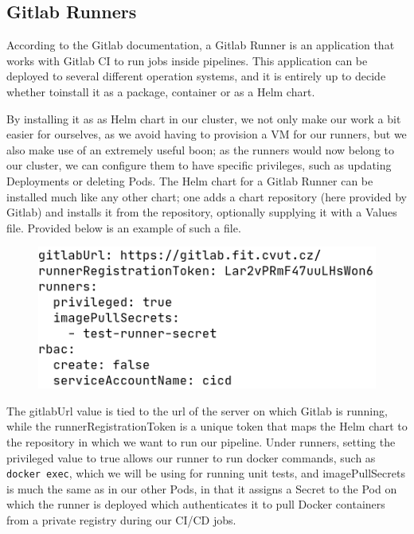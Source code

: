 \documentclass[thesis=B,english]{FITthesis}[2019/12/23]
\begin{document}
\subsection{Gitlab Runners}

According to the Gitlab documentation, a Gitlab Runner is an application that works with Gitlab CI to run jobs inside pipelines. This application can be deployed to several different operation systems, and it is entirely up to decide whether toinstall it as a package, container or as a Helm chart.

By installing it as as Helm chart in our cluster, we not only make our work a bit easier for ourselves, as we avoid having to provision a VM for our runners, but we also make use of an extremely useful boon; as the runners would now belong to our cluster, we can configure them to have specific privileges, such as updating Deployments or deleting Pods. The Helm chart for a Gitlab Runner can be installed much like any other chart; one adds a chart repository (here provided by Gitlab) and installs it from the repository, optionally supplying it with a Values file. Provided below is an example of such a file.

\begin{figure}[H]
\centering
\hspace*{-0.6cm}
\includegraphics[scale=0.5]{runner-values}
\end{figure}

The gitlabUrl value is tied to the url of the server on which Gitlab is running, while the runnerRegistrationToken is a unique token that maps the Helm chart to the repository in which we want to run our pipeline. Under runners, setting the privileged value to true allows our runner to run docker commands, such as \verb|docker exec|, which we will be using for running unit tests, and imagePullSecrets is much the same as in our other Pods, in that it assigns a Secret to the Pod on which the runner is deployed which authenticates it to pull Docker containers from a private registry during our CI/CD jobs.
\end{document}
